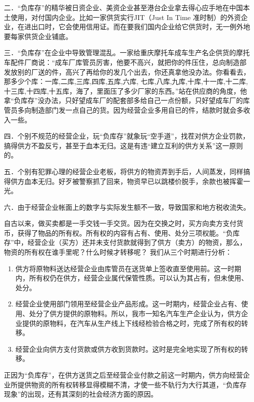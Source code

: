     二．“负库存”的精华被日资企业、美资企业甚至港台企业拿去得心应手地在中国本土使用，对付国内企业。比如一家供货实行JIT（Just In Time 准时制）的外资企业，在进出口时，它会使用信用证。而在要我们国内企业给它供货时，无一例外地要每家供货企业铺底。

    三．“负库存”在企业中导致管理混乱。一家给重庆摩托车成车生产名企供货的摩托车配件厂商说：“成车厂库管员厉害，他要不高兴，就把你的件压住，总向制造部发放别的厂送的件，高兴了再给你的发几个出去，你还真拿他没办法。你看看去，那多少个库：一库,二库,三库,四库,五库,六库, 七库,八库,九库,十库,十一库,十二库,十三库,十四库,十五库，海了，里面压了多少厂家的东西。”站在供应商的角度，他拿“负库存”没办法，只好望成车厂的配套部多给自己一点份额，只好望成车厂的库管员多向制造部门发一点自己的货。因为经营企业多用自已的件，结款时就会多收入一些。

    四．个别不规范的经营企业，玩“负库存”就象玩“空手道”，找茬对供方企业罚款，搞得供方不盈反亏，甚至于血本无归。这是有违“建立互利的供方关系”这一原则的。

    五．个别有犯罪心理的经营企业老板，将供方的物资弄到手后，人间蒸发，同样搞得供方血本无归。好歹被警察抓了回来，物资早已以跳楼价脱手，余款也被挥霍一光。

    六．由于经营企业帐面上的数字与实际发生额不一致，导致国家和地方税收流失。

    自古以来，做买卖都是一手交钱一手交货。因为在交换之时，买方向卖方支付货币，获得了物品的所有权。所有权的内容有占有、使用、处分三项权能。“负库存”中，经营企业（买方）还并未支付货款就得到了供方（卖方）的物资，那么，物资的所有权在谁手里呢？什么时候才转移呢？ 我们从三个时期进行分析：

    \begin{enumerate}
        \item  供方将原物料送达经营企业由库管员在送货单上签收直至使用前。这一时期内，所有权仍在供方，经营企业属代保管性质。可以认为其占有，但未使用、处分。
        \item  经营企业使用部门领用至经营企业产品形成。这一时期内，经营企业占有、使用、处分了供方提供的原物料。所以，我市一知名汽车生产企业认为，供方企业提供的原物料，在汽车从生产线上下线经检验合格之时，完成了所有权的转移。
        \item  经营企业向供方支付货款或供方收到货款时。这时是完全地实现了所有权的转移。
    \end{enumerate}

    正因为“负库存”，在供方送货之后至经营企业付款之前这一时期内，供方向经营企业所提供物资的所有权转移显得模糊不清，才使一些不轨行为大行其道，“负库存现象”的出现，还有其深刻的社会经济方面的原因。

